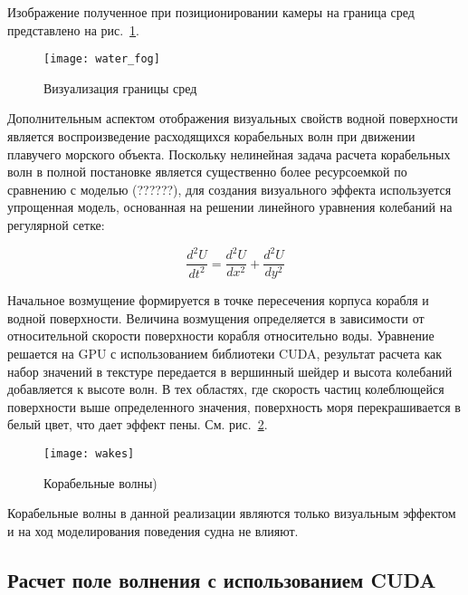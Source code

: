 Изображение полученное при позиционировании камеры на граница сред представлено на рис.~\ref{water_fog}.

\begin{figure}[ht]
\begin{center}
\texttt{[image: water\_fog]}
\end{center}
\caption{Визуализация границы сред}
\label{water_fog}
\end{figure}



Дополнительным аспектом отображения визуальных свойств водной поверхности является воспроизведение расходящихся корабельных волн при движении плавучего морского объекта. Поскольку нелинейная задача расчета корабельных волн в полной постановке является существенно более ресурсоемкой по сравнению с моделью (??????), для создания визуального эффекта используется упрощенная модель, основанная на решении линейного уравнения колебаний на регулярной сетке:

\begin{equation}
	\label{wake_equation}
	\frac{d^2U}{dt^2} = \frac{d^2U}{dx^2} +  \frac{d^2U}{dy^2}
\end{equation}

Начальное возмущение формируется в точке пересечения корпуса корабля и водной поверхности. Величина возмущения определяется в зависимости от относительной скорости поверхности корабля относительно воды. Уравнение решается на GPU с использованием библиотеки CUDA, результат расчета как набор значений в текстуре передается в вершинный шейдер и высота колебаний добавляется к высоте волн. В тех областях, где скорость частиц колеблющейся поверхности выше определенного значения, поверхность моря перекрашивается в белый цвет, что дает эффект пены. См. рис.~\ref{wakes}.

\begin{figure}[ht]
\begin{center}
\texttt{[image: wakes]}
\end{center}
\caption{Корабельные волны)}
\label{wakes}
\end{figure}

Корабельные волны в данной реализации являются только визуальным эффектом и на ход моделирования поведения судна не влияют.



\subsection{Расчет поле волнения с использованием CUDA}

